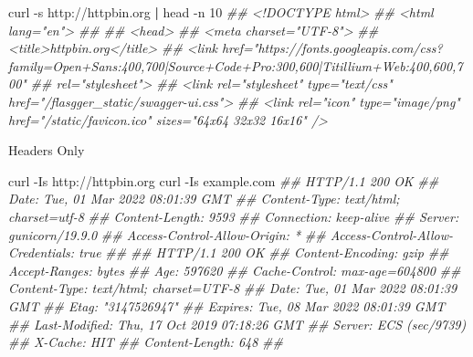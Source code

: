 \documentclass[
  10pt,
]{article}
\newenvironment{Shaded}{\begin{snugshade}}{\end{snugshade}}
\newcommand{\CommentTok}[1]{\textcolor[rgb]{0.56,0.35,0.01}{\textit{#1}}}
\newcommand{\KeywordTok}[1]{\textcolor[rgb]{0.13,0.29,0.53}{\textbf{#1}}}
\newcommand{\NormalTok}[1]{#1}
\begin{document}
\begin{Shaded}
\begin{Highlighting}[]
\NormalTok{curl {-}s http://httpbin.org }\KeywordTok{|}\NormalTok{ head {-}n 10}
      \CommentTok{\#\# \textless{}!DOCTYPE html\textgreater{}}
      \CommentTok{\#\# \textless{}html lang="en"\textgreater{}}
      \CommentTok{\#\# }
      \CommentTok{\#\# \textless{}head\textgreater{}}
      \CommentTok{\#\#     \textless{}meta charset="UTF{-}8"\textgreater{}}
      \CommentTok{\#\#     \textless{}title\textgreater{}httpbin.org\textless{}/title\textgreater{}}
      \CommentTok{\#\#     \textless{}link href="https://fonts.googleapis.com/css?family=Open+Sans:400,700|Source+Code+Pro:300,600|Titillium+Web:400,600,700"}
      \CommentTok{\#\#         rel="stylesheet"\textgreater{}}
      \CommentTok{\#\#     \textless{}link rel="stylesheet" type="text/css" href="/flasgger\_static/swagger{-}ui.css"\textgreater{}}
      \CommentTok{\#\#     \textless{}link rel="icon" type="image/png" href="/static/favicon.ico" sizes="64x64 32x32 16x16" /\textgreater{}}
\end{Highlighting}
\end{Shaded}

Headers Only

\begin{Shaded}
\begin{Highlighting}[]
\NormalTok{curl {-}Is http://httpbin.org }
\NormalTok{curl {-}Is example.com}
      \CommentTok{\#\# HTTP/1.1 200 OK}
      \CommentTok{\#\# Date: Tue, 01 Mar 2022 08:01:39 GMT}
      \CommentTok{\#\# Content{-}Type: text/html; charset=utf{-}8}
      \CommentTok{\#\# Content{-}Length: 9593}
      \CommentTok{\#\# Connection: keep{-}alive}
      \CommentTok{\#\# Server: gunicorn/19.9.0}
      \CommentTok{\#\# Access{-}Control{-}Allow{-}Origin: *}
      \CommentTok{\#\# Access{-}Control{-}Allow{-}Credentials: true}
      \CommentTok{\#\# }
      \CommentTok{\#\# HTTP/1.1 200 OK}
      \CommentTok{\#\# Content{-}Encoding: gzip}
      \CommentTok{\#\# Accept{-}Ranges: bytes}
      \CommentTok{\#\# Age: 597620}
      \CommentTok{\#\# Cache{-}Control: max{-}age=604800}
      \CommentTok{\#\# Content{-}Type: text/html; charset=UTF{-}8}
      \CommentTok{\#\# Date: Tue, 01 Mar 2022 08:01:39 GMT}
      \CommentTok{\#\# Etag: "3147526947"}
      \CommentTok{\#\# Expires: Tue, 08 Mar 2022 08:01:39 GMT}
      \CommentTok{\#\# Last{-}Modified: Thu, 17 Oct 2019 07:18:26 GMT}
      \CommentTok{\#\# Server: ECS (sec/9739)}
      \CommentTok{\#\# X{-}Cache: HIT}
      \CommentTok{\#\# Content{-}Length: 648}
      \CommentTok{\#\# }
\end{Highlighting}
\end{Shaded}
\end{document}
